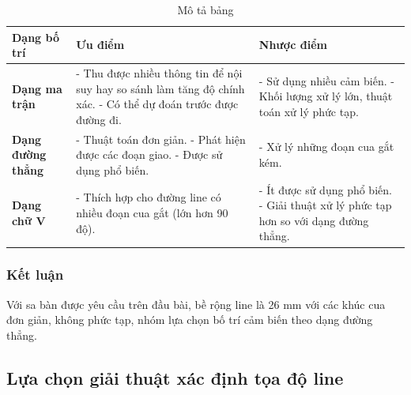                 \begin{table}[H]
                    \centering
                    \begin{tabular}{|p{3cm}|p{5cm}|p{5cm}|}
                        \hline
                        \textbf{Dạng bố trí} & \textbf{Ưu điểm} & \textbf{Nhược điểm} \\
                        \hline
                        \textbf{Dạng ma trận} &
                        - Thu được nhiều thông tin để nội suy hay so sánh làm tăng độ chính xác. \newline
                        - Có thể dự đoán trước được đường đi. &
                        - Sử dụng nhiều cảm biến. \newline
                        - Khối lượng xử lý lớn, thuật toán xử lý phức tạp. \\ 
                        \hline
                        \textbf{Dạng đường thẳng} &
                        - Thuật toán đơn giản.  \newline
                        - Phát hiện được các đoạn giao. \newline
                        - Được sử dụng phổ biến.  &
                        - Xử lý những đoạn cua gắt kém. \\
                        \hline
                        \textbf{Dạng chữ V} &
                        - Thích hợp cho đường line có nhiều đoạn cua gắt (lớn hơn 90 độ). &
                        - Ít được sử dụng phổ biến. \newline
                        - Giải thuật xử lý phức tạp hơn so với dạng đường thẳng. \\ 
                        \hline
                    \end{tabular}
                    \caption{Mô tả bảng}
                    \label{tab:label}
                \end{table}
            \subsubsection{Kết luận}
                \hspace*{0.6cm}Với sa bàn được yêu cầu trên đầu bài, bề rộng line là 26 mm với các khúc cua đơn giản, không phức tạp, nhóm lựa chọn bố trí cảm biến theo dạng đường thẳng. 
        \subsection{Lựa chọn giải thuật xác định tọa độ line}
